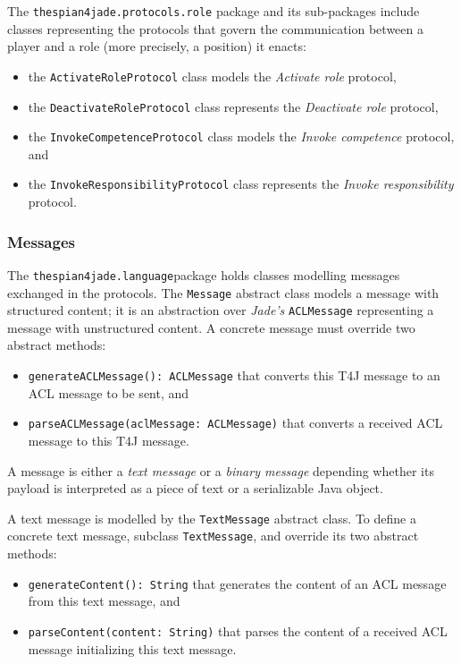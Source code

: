 The \texttt{thespian4jade.protocols.role} package and its sub-packages include classes representing the protocols that govern the communication between a player and a role (more precisely, a position) it enacts:
\begin{itemize}
	\item the \texttt{ActivateRoleProtocol} class models the \textit{Activate role} protocol,
	\item the \texttt{DeactivateRoleProtocol} class represents the \textit{Deactivate role} protocol,
	\item the \texttt{InvokeCompetenceProtocol} class models the \textit{Invoke competence} protocol, and
	\item the \texttt{InvokeResponsibilityProtocol} class represents the \textit{Invoke responsibility} protocol.
\end{itemize}

\subsubsection{Messages}

The \texttt{thespian4jade.language}package holds classes modelling messages exchanged in the protocols.
The \texttt{Message} abstract class models a message with structured content; it is an abstraction over \textit{Jade's} \texttt{ACLMessage} representing a message with unstructured content.
A concrete message must override two abstract methods:
\begin{itemize}
	\item \texttt{generateACLMessage(): ACLMessage} that converts this T4J message to an ACL message to be sent, and
	\item \texttt{parseACLMessage(aclMessage: ACLMessage)} that converts a received ACL message to this T4J message.
\end{itemize}

A message is either a \textit{text message} or a \textit{binary message} depending whether its payload is interpreted as a piece of text or a serializable Java object.

A text message is modelled by the \texttt{TextMessage} abstract class.
To define a concrete text message, subclass \texttt{TextMessage}, and override its two abstract methods:
\begin{itemize}
	\item \texttt{generateContent(): String} that generates the content of an ACL message from this text message, and
	\item \texttt{parseContent(content: String)} that parses the content of a received ACL message initializing this text message.
\end{itemize}

